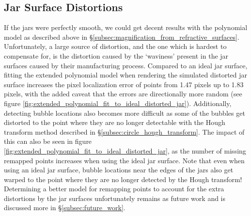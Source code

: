 \documentclass[11pt, letterpaper]{extarticle} %
\begin{document}
\subsection{Jar Surface Distortions} \label{subsec:jar_surface_distortions}
If the jars were perfectly smooth, we could get decent results with the polynomial model as described above in \S\ref{subsec:magnification_from_refractive_surfaces}. Unfortunately, a large source of distortion, and the one which is hardest to compensate for, is the distortion caused by the `waviness' present in the jar surfaces caused by their manufacturing process. Compared to an ideal jar surface, fitting the extended polynomial model when rendering the simulated distorted jar surface increases the pixel localization error of points from 1.47 pixels up to 1.83 pixels, with the added caveat that the errors are directionally more random (see figure \ref{fig:extended_polynomial_fit_to_ideal_distorted_jar}). Additionally, detecting bubble locations also becomes more difficult as some of the bubbles get distorted to the point where they are no longer detectable with the Hough transform method described in \S\ref{subsec:circle_hough_transform}. The impact of this can also be seen in figure \ref{fig:extended_polynomial_fit_to_ideal_distorted_jar}, as the number of missing remapped points increases when using the ideal jar surface. Note that even when using an ideal jar surface, bubble locations near the edges of the jars also get warped to the point where they are no longer detected by the Hough transform! Determining a better model for remapping points to account for the extra distortions by the jar surfaces unfortunately remains as future work and is discussed more in \S\ref{subsec:future_work}.
\end{document}
